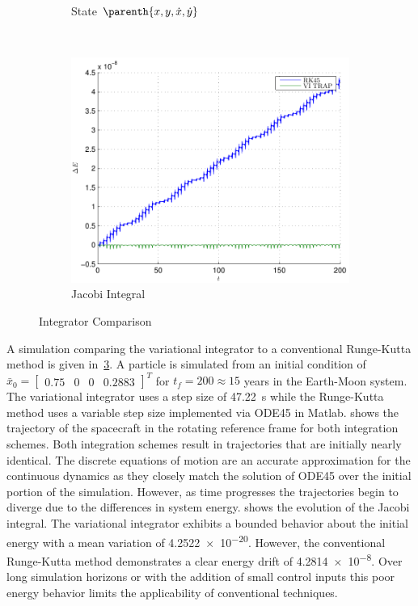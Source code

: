 \begin{figure}
\begin{subfigure}[htbp]{0.3\textwidth}
		\caption{State \( \parenth{x , y, \dot{x}, \dot{y}}\)} \label{fig:compare_components} 
	\end{subfigure} ~ %
	\begin{subfigure}[htbp]{0.3\textwidth} 
		\includegraphics[width=\textwidth]{figures/2015_AAS/integrator_compare/energy} 
		\caption{Jacobi Integral} \label{fig:compare_energy} 
	\end{subfigure} 
	\caption{Integrator Comparison}
	\label{fig:integrator_compare} 
\end{figure}
A simulation comparing the variational integrator to a conventional Runge-Kutta method is given in~\cref{fig:integrator_compare}.
A particle is simulated from an initial condition of \( \bar{x}_0 = \begin{bmatrix} 0.75 & 0 & 0 & 0.2883\end{bmatrix}^T \) for \( t_f = 200 \approx 15\) years in the Earth-Moon system.
The variational integrator uses a step size of \SI{47.22}{\second} while the Runge-Kutta method uses a variable step size implemented via ODE45 in Matlab.
 shows the trajectory of the spacecraft in the rotating reference frame for both integration schemes.
Both integration schemes result in trajectories that are initially nearly identical.
The discrete equations of motion are an accurate approximation for the continuous dynamics as they closely match the solution of ODE45 over the initial portion of the simulation.
However, as time progresses the trajectories begin to diverge due to the differences in system energy.
 shows the evolution of the Jacobi integral.
The variational integrator exhibits a bounded behavior about the initial energy with a mean variation of \num{4.2522e-20}.
However, the conventional Runge-Kutta method demonstrates a clear energy drift of \num{4.2814e-8}. 
Over long simulation horizons or with the addition of small control inputs this poor energy behavior limits the applicability of conventional techniques.

